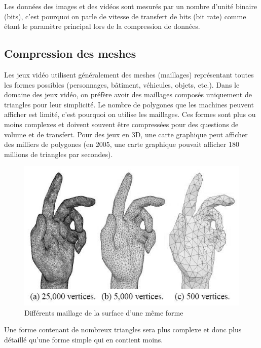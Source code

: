 \documentclass[a4paper, 11pt]{article} %
\begin{document}
Les données des images et des vidéos sont mesurés par un nombre d'unité binaire (bits), c'est pourquoi on parle de vitesse de transfert de bits (bit rate) comme étant le paramètre principal lors de la compression de données. 

\subsection*{Compression des meshes}
Les jeux vidéo utilisent généralement des meshes (maillages) représentant toutes les formes possibles (personnages, bâtiment, véhicules, objets, etc.). Dans le domaine des jeux vidéo, on préfère avoir des maillages composés uniquement de triangles pour leur simplicité. Le nombre de polygones que les machines peuvent afficher est limité, c'est pourquoi on utilise les maillages. Ces formes sont plus ou moins complexes et doivent souvent être compressées pour des questions de volume et de transfert. Pour des jeux en 3D, une carte graphique peut afficher des milliers de polygones (en 2005, une carte graphique pouvait afficher 180 millions de triangles par secondes).

\begin{figure}[!h]%
\includegraphics[width=\columnwidth]{images/meshes.jpg}%
\caption{Différents maillage de la surface d'une même forme}%
\label{}%
\end{figure}

Une forme contenant de nombreux triangles sera plus complexe et donc plus détaillé qu'une forme simple qui en contient moins.
\end{document}
